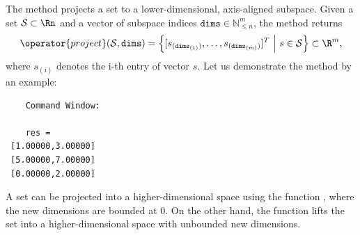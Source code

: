 
The method  projects a set to a lower-dimensional, axis-aligned subspace. Given a set $\mathcal{S} \subset \Rn$ and a vector of subspace indices $\texttt{dims} \in \mathbb{N}_{\leq n}^m$, the method  returns
\begin{equation*}
	\operator{project}(\mathcal{S},\texttt{dims}) = \Big \{ [s_{(\texttt{dims}_{(1)})},\dots,s_{(\texttt{dims}_{(m)})}]^T ~\Big |~ s \in \mathcal{S} \Big \} \subset \R^m,
\end{equation*}
where $s_{(i)}$ denotes the i-th entry of vector $s$. Let us demonstrate the method   by an example:

\begin{center}
\begin{minipage}[t]{0.40\textwidth}
	\vspace{10pt}
	\footnotesize
	
\end{minipage}
\begin{minipage}[t]{0.25\textwidth}
	\vspace{10pt}

	\begin{verbatim}	
	Command Window:
	
	res = 
 [1.00000,3.00000]
 [5.00000,7.00000]
 [0.00000,2.00000]
	\end{verbatim}
\end{minipage}
\end{center}

A set can be projected into a higher-dimensional space using the function ,
where the new dimensions are bounded at 0.
On the other hand, the function  lifts the set into a higher-dimensional space with unbounded new dimensions.
